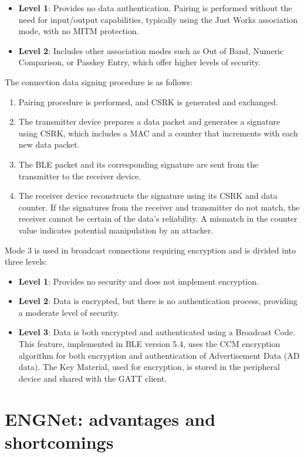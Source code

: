 \documentclass{Configuration_Files/PoliMi3i_thesis}
\begin{document}
\begin{itemize}
    \item \textbf{Level 1}: Provides no data authentication. Pairing is performed without the need for input/output capabilities, typically using the Just Works association mode, with no MITM protection.
    \item \textbf{Level 2}: Includes other association modes such as Out of Band, Numeric Comparison, or Passkey Entry, which offer higher levels of security.
\end{itemize}

The connection data signing procedure is as follows:
\begin{enumerate}
    \item Pairing procedure is performed, and CSRK is generated and exchanged.
    \item The transmitter device prepares a data packet and generates a signature using CSRK, which includes a MAC and a counter that increments with each new data packet.
    \item The BLE packet and its corresponding signature are sent from the transmitter to the receiver device.
    \item The receiver device reconstructs the signature using its CSRK and data counter. If the signatures from the receiver and transmitter do not match, the receiver cannot be certain of the data's reliability. A mismatch in the counter value indicates potential manipulation by an attacker.
\end{enumerate}

Mode 3 is used in broadcast connections requiring encryption and is divided into three levels:
\begin{itemize}
    \item \textbf{Level 1}: Provides no security and does not implement encryption.
    \item \textbf{Level 2}: Data is encrypted, but there is no authentication process, providing a moderate level of security.
    \item \textbf{Level 3}: Data is both encrypted and authenticated using a Broadcast Code. This feature, implemented in BLE version 5.4, uses the CCM encryption algorithm for both encryption and authentication of Advertisement Data (AD data). The Key Material, used for encryption, is stored in the peripheral device and shared with the GATT client.
\end{itemize}


\section{ENGNet: advantages and shortcomings}
\end{document}
